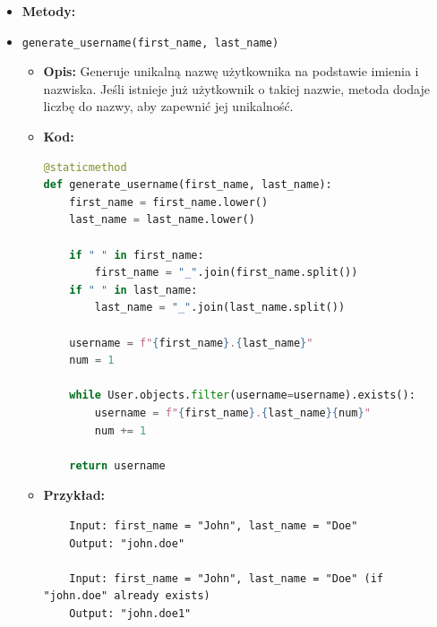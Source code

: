 \documentclass[12pt,a4paper,oneside]{article}
\theoremstyle{definition}
\numberwithin{equation}{section}
\begin{document}
\begin{itemize}
\begin{itemize}
        \item \texttt{clean\_phone\_number}
        \begin{itemize}
            \item \textbf{Opis:} Upewnia się, że numer telefonu zawiera dokładnie 9 cyfr.
            \item \textbf{Kod:}
            \begin{lstlisting}[language=Python, caption=Kod metody clean\_phone\_number]
def clean_phone_number(self):
    phone_number = self.cleaned_data.get("phone_number")
    parsed_phone_number = re.sub(r'\D', '', phone_number)
    if len(parsed_phone_number) != 9:
        raise ValidationError("Phone number must have exactly 9 digits.")
    return parsed_phone_number
        \end{lstlisting}
        \item \textbf{Przykład:}
        \begin{verbatim}
Input: phone_number = "+48 123-456-789"
Output: "123456789"
            \end{verbatim}
        \end{itemize}
    \end{itemize}

    \item \textbf{Metody:}
    \item \texttt{generate\_username(first\_name, last\_name)}
    \begin{itemize}
        \item \textbf{Opis:} Generuje unikalną nazwę użytkownika na podstawie imienia i nazwiska. Jeśli istnieje już użytkownik o takiej nazwie, metoda dodaje liczbę do nazwy, aby zapewnić jej unikalność.
        \item \textbf{Kod:}
        \begin{lstlisting}[language=Python, caption=Kod metody generate\_username]
@staticmethod
def generate_username(first_name, last_name):
    first_name = first_name.lower()
    last_name = last_name.lower()

    if " " in first_name:
        first_name = "_".join(first_name.split())
    if " " in last_name:
        last_name = "_".join(last_name.split())

    username = f"{first_name}.{last_name}"
    num = 1

    while User.objects.filter(username=username).exists():
        username = f"{first_name}.{last_name}{num}"
        num += 1

    return username
        \end{lstlisting}
        \item \textbf{Przykład:}
        \begin{verbatim}
    Input: first_name = "John", last_name = "Doe"
    Output: "john.doe"

    Input: first_name = "John", last_name = "Doe" (if "john.doe" already exists)
    Output: "john.doe1"
        \end{verbatim}
    \end{itemize}
\end{itemize}
\end{document}
